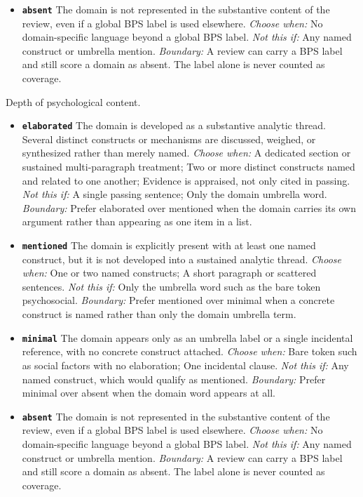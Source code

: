 \documentclass[11pt]{article}
\begin{document}
\begin{description}
\begin{itemize}[leftmargin=1.3em,itemsep=2pt,topsep=2pt]
  \item \textbf{\texttt{absent}} The domain is not represented in the substantive content of the review, even if a global BPS label is used elsewhere. {\small \textit{Choose when:} No domain-specific language beyond a global BPS label. \textit{Not this if:} Any named construct or umbrella mention. \textit{Boundary:} A review can carry a BPS label and still score a domain as absent. The label alone is never counted as coverage.}
  \end{itemize}
\item[\texttt{domain\_coverage\_psych}] Depth of psychological content.
  \begin{itemize}[leftmargin=1.3em,itemsep=2pt,topsep=2pt]
  \item \textbf{\texttt{elaborated}} The domain is developed as a substantive analytic thread. Several distinct constructs or mechanisms are discussed, weighed, or synthesized rather than merely named. {\small \textit{Choose when:} A dedicated section or sustained multi-paragraph treatment; Two or more distinct constructs named and related to one another; Evidence is appraised, not only cited in passing. \textit{Not this if:} A single passing sentence; Only the domain umbrella word. \textit{Boundary:} Prefer elaborated over mentioned when the domain carries its own argument rather than appearing as one item in a list.}
  \item \textbf{\texttt{mentioned}} The domain is explicitly present with at least one named construct, but it is not developed into a sustained analytic thread. {\small \textit{Choose when:} One or two named constructs; A short paragraph or scattered sentences. \textit{Not this if:} Only the umbrella word such as the bare token psychosocial. \textit{Boundary:} Prefer mentioned over minimal when a concrete construct is named rather than only the domain umbrella term.}
  \item \textbf{\texttt{minimal}} The domain appears only as an umbrella label or a single incidental reference, with no concrete construct attached. {\small \textit{Choose when:} Bare token such as social factors with no elaboration; One incidental clause. \textit{Not this if:} Any named construct, which would qualify as mentioned. \textit{Boundary:} Prefer minimal over absent when the domain word appears at all.}
  \item \textbf{\texttt{absent}} The domain is not represented in the substantive content of the review, even if a global BPS label is used elsewhere. {\small \textit{Choose when:} No domain-specific language beyond a global BPS label. \textit{Not this if:} Any named construct or umbrella mention. \textit{Boundary:} A review can carry a BPS label and still score a domain as absent. The label alone is never counted as coverage.}

\end{itemize}
\end{description}
\end{document}
